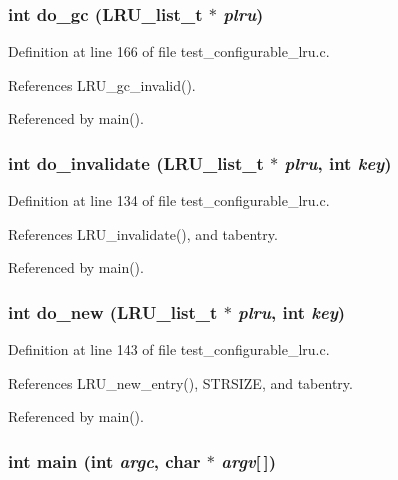 \subsubsection{\setlength{\rightskip}{0pt plus 5cm}int do\_\-gc (LRU\_\-list\_\-t $\ast$ {\em plru})}\label{test__configurable__lru_8c_a9}




Definition at line 166 of file test\_\-configurable\_\-lru.c.

References LRU\_\-gc\_\-invalid().

Referenced by main().
\subsubsection{\setlength{\rightskip}{0pt plus 5cm}int do\_\-invalidate (LRU\_\-list\_\-t $\ast$ {\em plru}, int {\em key})}\label{test__configurable__lru_8c_a7}




Definition at line 134 of file test\_\-configurable\_\-lru.c.

References LRU\_\-invalidate(), and tabentry.

Referenced by main().
\subsubsection{\setlength{\rightskip}{0pt plus 5cm}int do\_\-new (LRU\_\-list\_\-t $\ast$ {\em plru}, int {\em key})}\label{test__configurable__lru_8c_a8}




Definition at line 143 of file test\_\-configurable\_\-lru.c.

References LRU\_\-new\_\-entry(), STRSIZE, and tabentry.

Referenced by main().
\subsubsection{\setlength{\rightskip}{0pt plus 5cm}int main (int {\em argc}, char $\ast$ {\em argv}[$\,$])}\label{test__configurable__lru_8c_a10}




